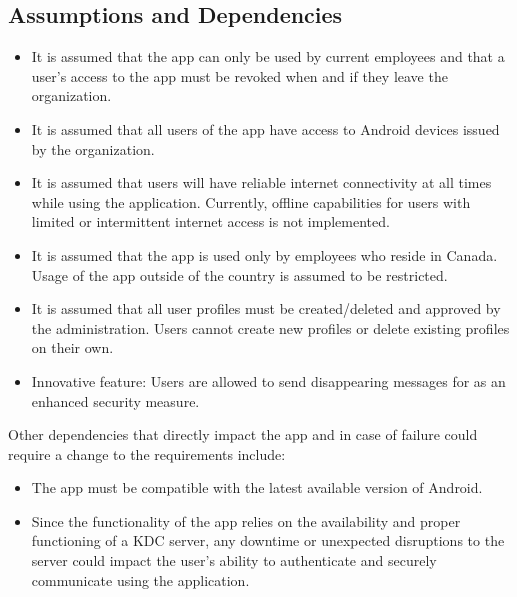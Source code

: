 \documentclass[]{article}
\begin{document}
\subsection{Assumptions and Dependencies}
\label{sub:assumptions_and_dependencies}
\begin{itemize}
	\item It is assumed that the app can only be used by current employees and that a user's access to the app must be revoked when and if they leave the organization.
 	\item It is assumed that all users of the app have access to Android devices issued by the organization.
  	\item It is assumed that users will have reliable internet connectivity at all times while using the application. Currently, offline capabilities for users with limited or intermittent internet access is not implemented.	
   	\item It is assumed that the app is used only by employees who reside in Canada. Usage of the app outside of the country is assumed to be restricted.
    	\item It is assumed that all user profiles must be created/deleted and approved by the administration. Users cannot create new profiles or delete existing profiles on their own.
    	\item Innovative feature: Users are allowed to send disappearing messages for as an enhanced security measure. 
\end{itemize}
Other dependencies that directly impact the app and in case of failure could require a change to the requirements include:
\begin{itemize}
	\item The app must be compatible with the latest available version of Android.
 	\item Since the functionality of the app relies on the availability and proper functioning of a KDC server, any downtime or unexpected disruptions to the server could impact the user's ability to authenticate and securely communicate using the application.
\end{itemize}
\end{document}
